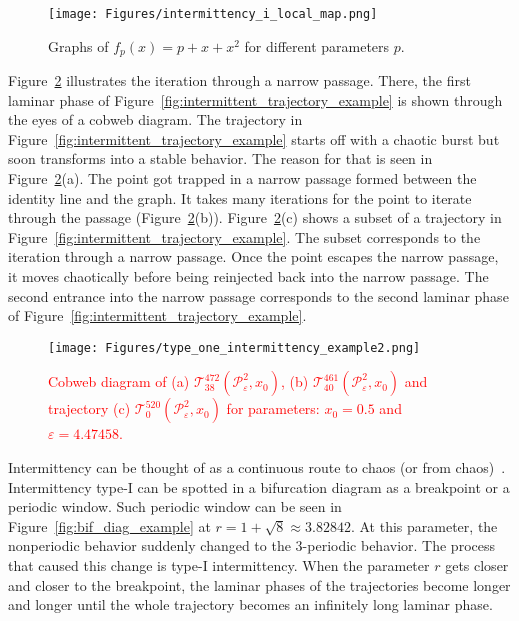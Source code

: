 \begin{figure}[!h]
    \centering
    \texttt{[image: Figures/intermittency\_i\_local\_map.png]}
    \caption{
        Graphs of $f_{p}(x) = p + x + x^2$ for different parameters $p$.
    }
    \label{fig:saddle_node_bifurcation}
\end{figure}

\par
Figure~\ref{fig:intermittent_cobweb_example} illustrates the iteration through a narrow passage.
There, the first laminar phase of Figure~\ref{fig:intermittent_trajectory_example} is shown through the eyes of a cobweb diagram.
The trajectory in Figure~\ref{fig:intermittent_trajectory_example} starts off with a chaotic burst but soon transforms into a stable behavior.
The reason for that is seen in Figure~\ref{fig:intermittent_cobweb_example}(a). The point got trapped in a narrow passage formed between the identity line and the graph.
It takes many iterations for the point to iterate through the passage (Figure~\ref{fig:intermittent_cobweb_example}(b)).
Figure~\ref{fig:intermittent_cobweb_example}(c) shows a subset of a trajectory in Figure~\ref{fig:intermittent_trajectory_example}.
The subset corresponds to the iteration through a narrow passage.
Once the point escapes the narrow passage, it moves chaotically before being reinjected back into the narrow passage.
The second entrance into the narrow passage corresponds to the second laminar phase of Figure~\ref{fig:intermittent_trajectory_example}.

\begin{figure}[!h]
    \centering
    \texttt{[image: Figures/type\_one\_intermittency\_example2.png]}
    \caption{
        \textcolor{red}{Cobweb diagram of 
        (a) $\mathcal{T}^{472}_{38}(\mathcal{P}_{\varepsilon}^{2}, x_0)$,
        (b) $\mathcal{T}^{461}_{40}(\mathcal{P}_{\varepsilon}^{2}, x_0)$ and
        trajectory (c) $\mathcal{T}^{520}_{0}(\mathcal{P}_{\varepsilon}^{2}, x_0)$
        for parameters: $x_0 = 0.5$ and $\varepsilon = 4.47458$.}
    }
    \label{fig:intermittent_cobweb_example}
\end{figure}

\par
Intermittency can be thought of as a continuous route to chaos (or from chaos)~\cite{Strogatz201854}.
Intermittency type-I can be spotted in a bifurcation diagram as a breakpoint or a periodic window.
Such periodic window can be seen in Figure~\ref{fig:bif_diag_example} at $r = 1+\sqrt{8} \approx 3.82842$.
At this parameter, the nonperiodic behavior suddenly changed to the $3$-periodic behavior.
The process that caused this change is type-I intermittency.
When the parameter $r$ gets closer and closer to the breakpoint, the laminar phases of the trajectories become longer and longer until the whole trajectory becomes an infinitely long laminar phase.



